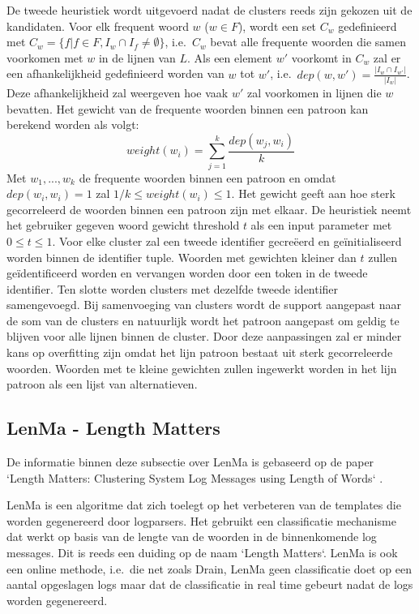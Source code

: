 \begin{itemize}
    \subitem De tweede heuristiek wordt uitgevoerd nadat de clusters reeds zijn gekozen uit de kandidaten. Voor elk frequent woord $w$ (\(w \in F\)), wordt een set \(C_{w}\) gedefinieerd met \(C_{w} = \{f \vert f \in F, I_{w} \cap I_{f} \neq \emptyset\}\), i.e.\ \(C_{w}\) bevat alle frequente woorden die samen voorkomen met $w$ in de lijnen van $L$. Als een element $w'$ voorkomt in \(C_{w}\) zal er een afhankelijkheid gedefinieerd worden van $w$ tot $w'$, i.e.\ \(dep(w, w') = \frac{\lvert I_{w} \cap I_{w'} \rvert}{\lvert I_{w} \rvert}\). Deze afhankelijkheid zal weergeven hoe vaak $w'$ zal voorkomen in lijnen die $w$ bevatten. Het gewicht van de frequente woorden binnen een patroon kan berekend worden als volgt:
    \[weight(w_{i}) = \sum_{j=1}^{k} \frac {dep(w_{j}, w_{i})}{k}\]
    Met \(w_{1}, ..., w_{k}\) de frequente woorden binnen een patroon en omdat \(dep(w_{i}, w_{i}) = 1\) zal \(1/k \leq weight(w_{i}) \leq 1\). Het gewicht geeft aan hoe sterk gecorreleerd de woorden binnen een patroon zijn met elkaar. De heuristiek neemt het gebruiker gegeven woord gewicht threshold $t$ als een input parameter met \(0 \le t \leq 1\). Voor elke cluster zal een tweede identifier gecreëerd en geïnitialiseerd worden binnen de identifier tuple. Woorden met gewichten kleiner dan $t$ zullen geïdentificeerd worden en vervangen worden door een token in de tweede identifier. Ten slotte worden clusters met dezelfde tweede identifier samengevoegd. Bij samenvoeging van clusters wordt de support aangepast naar de som van de clusters en natuurlijk wordt het patroon aangepast om geldig te blijven voor alle lijnen binnen de cluster. Door deze aanpassingen zal er minder kans op overfitting zijn omdat het lijn patroon bestaat uit sterk gecorreleerde woorden. Woorden met te kleine gewichten zullen ingewerkt worden in het lijn patroon als een lijst van alternatieven.
\end{itemize}

\subsection{LenMa - Length Matters}
De informatie binnen deze subsectie over LenMa is gebaseerd op de paper `Length Matters: Clustering System Log Messages using Length of Words` \autocite{shima2016length}.

LenMa is een algoritme dat zich toelegt op het verbeteren van de templates die worden gegenereerd door logparsers. Het gebruikt een classificatie mechanisme dat werkt op basis van de lengte van de woorden in de binnenkomende log messages. Dit is reeds een duiding op de naam `Length Matters`. LenMa is ook een online methode, i.e.\ die net zoals Drain, LenMa geen classificatie doet op een aantal opgeslagen logs maar dat de classificatie in real time gebeurt nadat de logs worden gegenereerd. 

